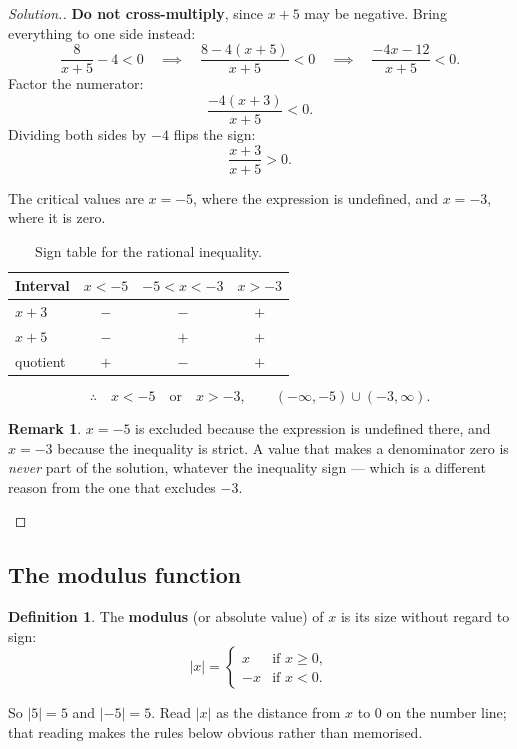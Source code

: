 \documentclass[11pt,a4paper]{article}
\theoremstyle{definition}
\newtheorem{definition}[thm]{Definition}
\newtheorem{remark}[thm]{Remark}
\newenvironment{solution}
  {\renewcommand{\qedsymbol}{}\begin{proof}[\textit{Solution}.]}
  {\end{proof}}
\begin{document}
\begin{solution}
\textbf{Do not cross-multiply}, since $x+5$ may be negative. Bring everything to one
side instead:
$$\frac{8}{x+5}-4<0\quad\implies\quad \frac{8-4(x+5)}{x+5}<0
\quad\implies\quad \frac{-4x-12}{x+5}<0.$$
Factor the numerator:
$$\frac{-4(x+3)}{x+5}<0.$$
Dividing both sides by $-4$ flips the sign:
$$\frac{x+3}{x+5}>0.$$

The critical values are $x=-5$, where the expression is undefined, and $x=-3$, where
it is zero.
\begin{table}[H]
\centering
\begin{tabular}{|l|c|c|c|}
\hline
Interval & $x<-5$ & $-5<x<-3$ & $x>-3$\\
\hline
$x+3$ & $-$ & $-$ & $+$\\
$x+5$ & $-$ & $+$ & $+$\\
\hline
quotient & $+$ & $-$ & $+$\\
\hline
\end{tabular}
\caption{Sign table for the rational inequality.}
\end{table}

$$\therefore\quad x<-5\quad\text{or}\quad x>-3,\qquad (-\infty,-5)\cup(-3,\infty).$$

\begin{remark}
$x=-5$ is excluded because the expression is undefined there, and $x=-3$ because the
inequality is strict. A value that makes a denominator zero is \emph{never} part of the
solution, whatever the inequality sign --- which is a different reason from the one
that excludes $-3$.
\end{remark}
\end{solution}

\subsection{The modulus function}

\begin{definition}
The \textbf{modulus} (or absolute value) of $x$ is its size without regard to sign:
$$|x|=\begin{cases} x & \text{if } x\geq 0,\\ -x & \text{if } x<0.\end{cases}$$
\end{definition}

So $|5|=5$ and $|-5|=5$. Read $|x|$ as the distance from $x$ to $0$ on the number line;
that reading makes the rules below obvious rather than memorised.
\end{document}

